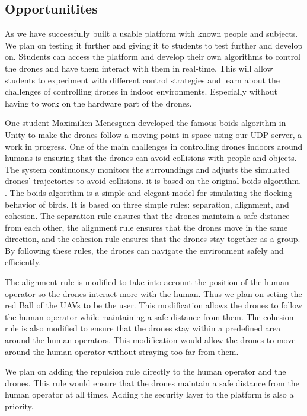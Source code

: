 \subsection{Opportunitites}

As we have successfully built a usable platform with known people and subjects. We plan on testing it further and giving it to students to test further and develop on.
Students can access the platform and develop their own algorithms to control the drones and have them interact with them in real-time. This will allow students to experiment with different control strategies and learn about the challenges of controlling drones in indoor environments. Especially without having to work on the hardware part of the drones.

One student Maximilien Menesguen \cite{max} developed the famous boids \cite{reynolds1987boids} algorithm in Unity to make the drones follow a moving point in space using our UDP server, a work in progress. 
One of the main challenges in controlling drones indoors around humans is ensuring that the drones can avoid collisions with people and objects. The system continuously monitors the surroundings and adjusts the simulated drones' trajectories to avoid collisions.
it is based on the original boids algorithm. \cite{reynolds1987boids}. The boids algorithm is a simple and elegant model for simulating the flocking behavior of birds. It is based on three simple rules: separation, alignment, and cohesion. The separation rule ensures that the drones maintain a safe distance from each other, the alignment rule ensures that the drones move in the same direction, and the cohesion rule ensures that the drones stay together as a group. By following these rules, the drones can navigate the environment safely and efficiently.

The alignment rule is modified to take into account the position of the human operator so the drones interact more with the human. Thus we plan on seting the red Ball of the UAVs to be the user. This modification allows the drones to follow the human operator while maintaining a safe distance from them. The cohesion rule is also modified to ensure that the drones stay within a predefined area around the human operators. This modification would allow the drones to move around the human operator without straying too far from them.

We plan on adding the repulsion rule directly to the human operator and the drones. This rule would ensure that the drones maintain a safe distance from the human operator at all times. Adding the security layer to the platform is also a priority.

